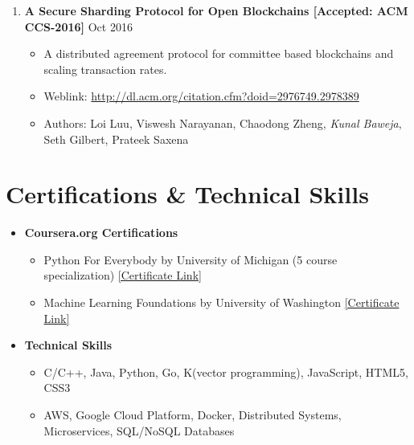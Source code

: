 \documentclass{article}
\newcommand{\bi}{\vspace{-1mm}\begin{itemize}[align=left,leftmargin=*, rightmargin=80pt, labelindent=0pt,labelsep=2pt, label={-}, nosep]}
\newcommand{\ei}{\end{itemize}}
\begin{document}
\begin{enumerate}
    \item \textbf{A Secure Sharding Protocol for Open Blockchains [Accepted: ACM CCS-2016]} {\hfill Oct 2016}
    \bi

        \item A distributed agreement protocol for committee based blockchains and scaling transaction rates.

        \item Weblink: \href{http://dl.acm.org/citation.cfm?doid=2976749.2978389}{http://dl.acm.org/citation.cfm?doid=2976749.2978389}
        
        \item Authors: Loi Luu, Viswesh Narayanan, Chaodong Zheng, \textit{Kunal Baweja}, Seth Gilbert, Prateek Saxena
    \ei

\end{enumerate}

\vspace{-2mm}
\section*{Certifications \& Technical Skills}
\begin{itemize}
    \item \textbf{Coursera.org Certifications}
    \bi
        \item Python For Everybody by University of Michigan (5 course specialization) \href{https://www.coursera.org/account/accomplishments/specialization/2B5PCJGZ9WEE}{[Certificate Link]}

        \item Machine Learning Foundations by University of Washington \href{https://www.coursera.org/account/accomplishments/certificate/NDVXWMCYKX9N}{[Certificate Link]}
    \ei

    \item \textbf{Technical Skills}
    \bi
        \item C/C++, Java, Python, Go, K(vector programming), JavaScript, HTML5, CSS3
        \item AWS, Google Cloud Platform, Docker, Distributed Systems, Microservices, SQL/NoSQL Databases
    \ei
\end{itemize}
\end{document}
